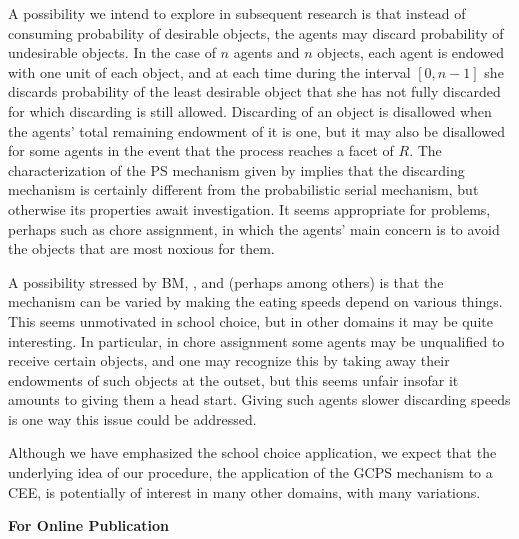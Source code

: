 \documentclass[12pt, A4paper]{article}
\theoremstyle{definition}
\begin{document}
A possibility we intend to explore in subsequent research is that instead of consuming probability of desirable objects, the agents may discard probability of undesirable objects.  In the case of $n$ agents and $n$ objects, each agent is endowed with one unit of each object, and at each time during the interval $[0,n-1]$ she discards probability of the least desirable object that she has not fully discarded for which discarding is still allowed.  Discarding of an object is disallowed when the agents' total remaining endowment of it is one, but it may also be disallowed for some agents in the event that the process reaches a facet of $R$.  The characterization of the PS mechanism given by \cite{bh12} implies that the discarding mechanism is certainly different from the probabilistic serial mechanism, but otherwise its properties await investigation.  It seems appropriate for problems, perhaps such as chore assignment, in which the agents' main concern is to avoid the objects that are most noxious for them.

A possibility stressed by BM, \cite{cho18scw}, and \cite{balbuzanov22jet} (perhaps among others) is that the mechanism can be varied by making the eating speeds depend on various things.  This seems unmotivated in school choice, but in other domains it may be quite interesting.    In particular, in chore assignment some agents may be unqualified to receive certain objects, and one may recognize this by taking away their endowments of such objects at the outset, but this seems unfair insofar it amounts to giving them a head start.  Giving such agents slower discarding speeds is one way this issue could be addressed. 

Although we have emphasized the school choice application, we expect that the underlying idea of our procedure, the application of the GCPS mechanism to a CEE, is potentially of interest in many other domains, with many variations.  




\pagebreak
\begin{center}
\Large \textbf{For Online Publication}
\end{center}
\end{document}
